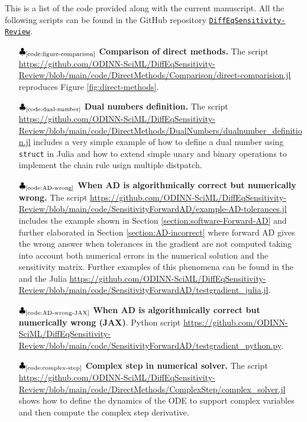 This is a list of the code provided along with the current manuscript.
All the following scripts can be found in the GitHub repository \href{https://github.com/ODINN-SciML/DiffEqSensitivity-Review}{\texttt{DiffEqSensitivity-Review}}. 
 
\begin{itemize}
    \item[$\clubsuit_\text{\ref{code:figure-comparison}}$] \textbf{Comparison of direct methods.} The script \url{https://github.com/ODINN-SciML/DiffEqSensitivity-Review/blob/main/code/DirectMethods/Comparison/direct-comparision.jl} reproduces Figure \ref{fig:direct-methods}.
    
    \item[$\clubsuit_\text{\ref{code:dual-number}}$] \textbf{Dual numbers definition.} The script \url{https://github.com/ODINN-SciML/DiffEqSensitivity-Review/blob/main/code/DirectMethods/DualNumbers/dualnumber_definition.jl} includes a very simple example of how to define a dual number using \texttt{struct} in Julia and how to extend simple unary and binary operations to implement the chain rule usign multiple distpatch. 
    
    \item[$\clubsuit_\text{\ref{code:AD-wrong}}$] \textbf{When AD is algorithmically correct but numerically wrong.} The script \url{https://github.com/ODINN-SciML/DiffEqSensitivity-Review/blob/main/code/SensitivityForwardAD/example-AD-tolerances.jl} includes the example shown in Section \ref{section:software-Forward-AD} and further elaborated in Section \ref{section:AD-incorrect} where forward AD gives the wrong answer when tolerances in the gradient are not computed taking into account both numerical errors in the numerical solution and the sensitivity matrix. Further examples of this phenomena can be found in the  and the Julia \url{https://github.com/ODINN-SciML/DiffEqSensitivity-Review/blob/main/code/SensitivityForwardAD/testgradient_julia.jl}.
    
    \item[$\clubsuit_\text{\ref{code:AD-wrong-JAX}}$] \textbf{When AD is algorithmically correct but numerically wrong (JAX)}. Python script \url{https://github.com/ODINN-SciML/DiffEqSensitivity-Review/blob/main/code/SensitivityForwardAD/testgradient_python.py}.
    \item[$\clubsuit_\text{\ref{code:complex-step}}$] \textbf{Complex step in numerical solver.} The script \url{https://github.com/ODINN-SciML/DiffEqSensitivity-Review/blob/main/code/DirectMethods/ComplexStep/complex_solver.jl} shows how to define the dynamics of the ODE to support complex variables and then compute the complex step derivative. 
    

\end{itemize}
